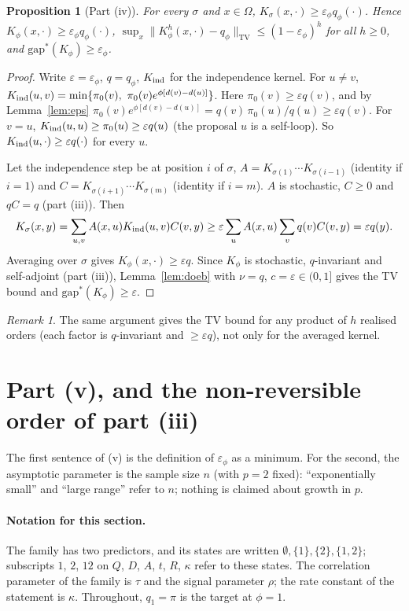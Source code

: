 \documentclass[11pt]{article}
\newtheorem{proposition}[theorem]{Proposition}
\theoremstyle{remark}
\newtheorem{remark}[theorem]{Remark}
\newcommand{\Om}{\Omega}
\newcommand{\eps}{\varepsilon}
\newcommand{\gs}{\mathrm{gap}^*}
\newcommand{\TV}{\mathrm{TV}}
\begin{document}
\begin{proposition}[Part (iv)]
For every $\sigma$ and $x\in\Om$, $K_\sigma(x,\cdot)\ge\eps_\phi q_\phi(\cdot)$. Hence $K_\phi(x,\cdot)\ge\eps_\phi q_\phi(\cdot)$, $\sup_x\|K_\phi^h(x,\cdot)-q_\phi\|_\TV\le(1-\eps_\phi)^h$ for all $h\ge0$, and $\gs(K_\phi)\ge\eps_\phi$.
\end{proposition}
\begin{proof}
Write $\eps=\eps_\phi$, $q=q_\phi$, $K_{\rm ind}$ for the independence kernel. For $u\ne v$,
$K_{\rm ind}(u,v)=\min\{\pi_0(v),\ \pi_0(v)e^{\phi[d(v)-d(u)]}\}$. Here $\pi_0(v)\ge\eps q(v)$, and by Lemma~\ref{lem:eps} $\pi_0(v)e^{\phi[d(v)-d(u)]}=q(v)\,\pi_0(u)/q(u)\ge\eps q(v)$. For $v=u$, $K_{\rm ind}(u,u)\ge\pi_0(u)\ge\eps q(u)$ (the proposal $u$ is a self-loop). So $K_{\rm ind}(u,\cdot)\ge\eps q(\cdot)$ for every $u$.

Let the independence step be at position $i$ of $\sigma$, $A=K_{\sigma(1)}\cdots K_{\sigma(i-1)}$ (identity if $i=1$) and $C=K_{\sigma(i+1)}\cdots K_{\sigma(m)}$ (identity if $i=m$). $A$ is stochastic, $C\ge0$ and $qC=q$ (part (iii)). Then
\[K_\sigma(x,y)=\sum_{u,v}A(x,u)K_{\rm ind}(u,v)C(v,y)\ge\eps\sum_uA(x,u)\sum_vq(v)C(v,y)=\eps q(y).\]
Averaging over $\sigma$ gives $K_\phi(x,\cdot)\ge\eps q$. Since $K_\phi$ is stochastic, $q$-invariant and self-adjoint (part (iii)), Lemma~\ref{lem:doeb} with $\nu=q$, $c=\eps\in(0,1]$ gives the TV bound and $\gs(K_\phi)\ge\eps$.
\end{proof}

\begin{remark}
The same argument gives the TV bound for any product of $h$ realised orders (each factor is $q$-invariant and $\ge\eps q$), not only for the averaged kernel.
\end{remark}

\section{Part (v), and the non-reversible order of part (iii)}\label{sec:family}

The first sentence of (v) is the definition of $\eps_\phi$ as a minimum. For the second, the asymptotic parameter is the sample size $n$ (with $p=2$ fixed): ``exponentially small'' and ``large range'' refer to $n$; nothing is claimed about growth in $p$.

\paragraph{Notation for this section.} The family has two predictors, and its states are written $\emptyset,\{1\},\{2\},\{1,2\}$; subscripts $1$, $2$, $12$ on $Q$, $D$, $A$, $t$, $R$, $\kappa$ refer to these states. The correlation parameter of the family is $\tau$ and the signal parameter $\rho$; the rate constant of the statement is $\kappa$. Throughout, $q_1=\pi$ is the target at $\phi=1$.
\end{document}
